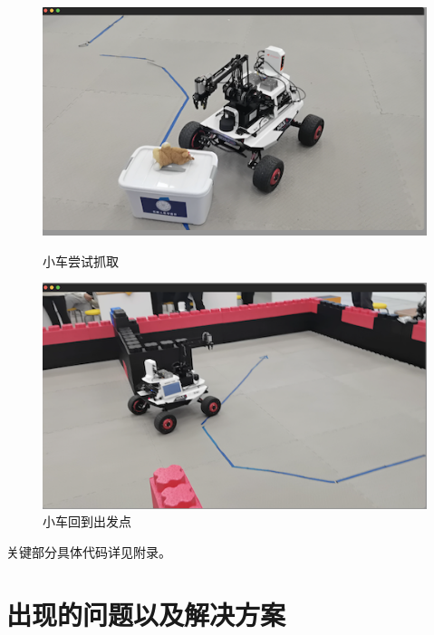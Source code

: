 \documentclass[a4paper,twoside]{article}
\begin{document}
\begin{figure}[htbp]
	\centering
	\begin{minipage}{0.49\linewidth}
		\centering
		\includegraphics[width=1.0\linewidth]{video1.png}
		\caption{小车尝试抓取}
	\end{minipage}
	\begin{minipage}{0.49\linewidth}
		\centering
		\includegraphics[width=1.0\linewidth]{video2.png}
		\caption{小车回到出发点}
	\end{minipage}
\end{figure}

关键部分具体代码详见附录。

\newpage
\section{出现的问题以及解决方案}
\end{document}
